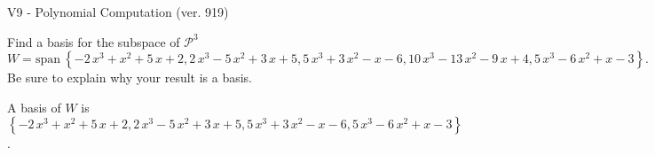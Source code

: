 \begin{exercise}
  \begin{exerciseTitle}V9 - Polynomial Computation (ver. 919)\end{exerciseTitle}
  \begin{exerciseStatement}
    Find a basis for the subspace of \(\mathcal{P}^3\) 
\[W=\mathrm{span}\ \left\{-2 \, x^{3} + x^{2} + 5 \, x + 2 , 2 \, x^{3} - 5 \, x^{2} + 3 \, x + 5 , 5 \, x^{3} + 3 \, x^{2} - x - 6 , 10 \, x^{3} - 13 \, x^{2} - 9 \, x + 4 , 5 \, x^{3} - 6 \, x^{2} + x - 3\right\}.\]
 Be sure to explain why your result is a basis.


  \end{exerciseStatement}
  \begin{exerciseAnswer}
   A basis of \(W\) is  \(\left\{-2 \, x^{3} + x^{2} + 5 \, x + 2 , 2 \, x^{3} - 5 \, x^{2} + 3 \, x + 5 , 5 \, x^{3} + 3 \, x^{2} - x - 6 , 5 \, x^{3} - 6 \, x^{2} + x - 3\right\}\).
  


  \end{exerciseAnswer}
\end{exercise}